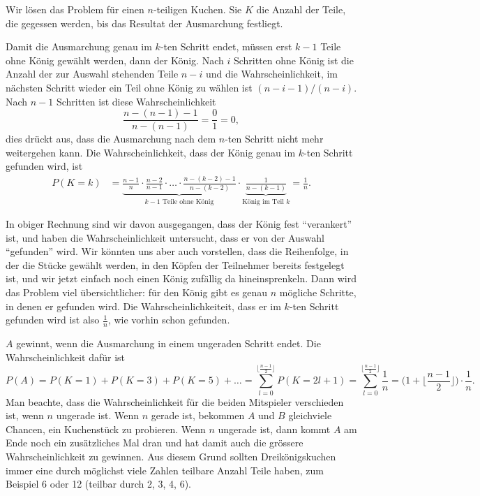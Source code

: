 \begin{loesung}
Wir lösen das Problem für einen $n$-teiligen Kuchen.
Sie $K$ die Anzahl der Teile, die gegessen werden, bis das Resultat
der Ausmarchung festliegt.

\begin{teilaufgaben}
\item
Damit die Ausmarchung genau im $k$-ten Schritt endet, müssen erst
$k-1$ Teile ohne König gewählt werden, dann der König.
Nach $i$ Schritten ohne König ist die Anzahl der zur Auswahl
stehenden Teile $n-i$ und die Wahrscheinlichkeit, im nächsten Schritt
wieder ein Teil ohne König zu wählen ist $(n-i-1)/(n-i)$.
Nach $n-1$ Schritten ist diese Wahrscheinlichkeit
\[
\frac{n-(n-1)-1}{n-(n-1)}
=
\frac{0}{1}=0,
\]
dies drückt aus, dass die Ausmarchung nach dem $n$-ten Schritt nicht
mehr weitergehen kann.
Die Wahrscheinlichkeit, dass der König genau im $k$-ten Schritt gefunden
wird, ist
\begin{align*}
P(K=k)
&=
\underbrace{
\frac{n-1}{n}
\cdot
\frac{n-2}{n-1}
\cdot \ldots \cdot
\frac{n-(k-2)-1}{n-(k-2)}
}_{\text{$k-1$ Teile ohne König}}
\cdot
\underbrace{
\frac{1}{n-(k-1)}
}_{\text{König im Teil $k$}}
=
\frac{1}{n}.
\end{align*}

In obiger Rechnung sind wir davon ausgegangen, dass der König fest
``verankert'' ist, und haben die Wahrscheinlichkeit untersucht, dass
er von der Auswahl ``gefunden'' wird.
Wir könnten uns aber auch vorstellen, dass die Reihenfolge, in der
die Stücke gewählt werden, in den Köpfen der Teilnehmer bereits 
festgelegt ist, und wir jetzt einfach noch einen König zufällig
da hineinsprenkeln.
Dann wird das Problem viel übersichtlicher: für den König gibt es 
genau $n$ mögliche Schritte, in denen er gefunden wird.
Die Wahrscheinlichkeiteit, dass er im $k$-ten Schritt gefunden wird
ist also $\frac1n$, wie vorhin schon gefunden.

\item
$A$ gewinnt, wenn die Ausmarchung in einem ungeraden Schritt endet.
Die Wahrscheinlichkeit dafür ist
\[
P(A)
= 
P(K=1) + P(K=3) + P(K=5) + \dots 
=
\sum_{l=0}^{\lfloor\frac{n-1}{2}\rfloor} P(K=2l+1)
=
\sum_{l=0}^{\lfloor\frac{n-1}{2}\rfloor} \frac1n
=
\biggl(
1+
\biggl\lfloor \frac{n-1}{2}\biggr\rfloor
\biggr)
\cdot
\frac{1}{n}.
\]
Man beachte, dass die Wahrscheinlichkeit für die beiden
Mitspieler verschieden ist, wenn $n$ ungerade ist.
Wenn $n$ gerade ist, bekommen $A$ und $B$ gleichviele
Chancen, ein Kuchenstück zu probieren.
Wenn $n$ ungerade ist, dann kommt $A$ am Ende noch ein
zusätzliches Mal dran und hat damit auch die grössere
Wahrscheinlichkeit zu gewinnen.
Aus diesem Grund sollten Dreikönigskuchen immer eine
durch möglichst viele Zahlen teilbare Anzahl Teile haben,
zum Beispiel 6 oder 12 (teilbar durch 2, 3, 4, 6).


\end{teilaufgaben}
\end{loesung}
